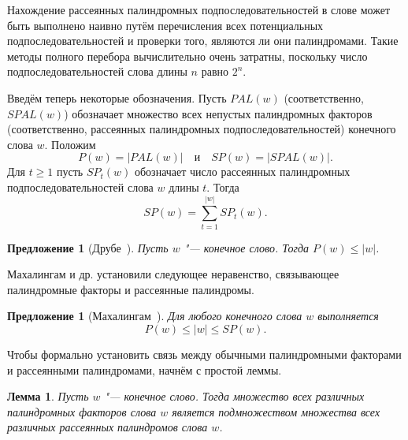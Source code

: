 \documentclass[a4paper,14pt]{extreport}
\theoremstyle{plain}
\newtheorem{lemma}{Лемма}[section]
\newtheorem{proposition}[theorem]{Предложение}
\theoremstyle{definition}
\theoremstyle{remark}
\begin{document}
Нахождение рассеянных палиндромных подпоследовательностей в слове может быть выполнено наивно путём перечисления всех потенциальных подпоследовательностей и проверки того, являются ли они палиндромами. Такие методы полного перебора вычислительно очень затратны, поскольку число подпоследовательностей слова длины $n$ равно $2^n$.

Введём теперь некоторые обозначения. Пусть $PAL(w)$ (соответственно, $SPAL(w)$) обозначает множество всех непустых палиндромных факторов (соответственно, рассеянных палиндромных подпоследовательностей) конечного слова $w$. Положим
\begin{equation}
	P(w) = |PAL(w)| \quad \text{и} \quad SP(w) = |SPAL(w)|.
\end{equation}
Для $t \geq 1$ пусть $SP_t(w)$ обозначает число рассеянных палиндромных подпоследовательностей слова $w$ длины $t$. Тогда
\begin{equation}
	SP(w) = \sum_{t=1}^{|w|} SP_t(w).
\end{equation}

\begin{proposition}[Друбе~\cite{Droubay}]\label{pro.5.3}
	Пусть $w$ "--- конечное слово. Тогда $P(w) \leq |w|$.
\end{proposition}

Махалингам и др. установили следующее неравенство, связывающее палиндромные факторы и рассеянные палиндромы.

\begin{proposition}[Махалингам~\cite{Mahalingam}]
	Для любого конечного слова $w$ выполняется
	\begin{equation}
		P(w) \leq |w| \leq SP(w).
	\end{equation}
\end{proposition}

Чтобы формально установить связь между обычными палиндромными факторами и рассеянными палиндромами, начнём с простой леммы.

\begin{lemma}\label{lem:pal_subset_spal}
	Пусть $w$ "--- конечное слово. Тогда множество всех различных палиндромных факторов слова $w$ является подмножеством множества всех различных рассеянных палиндромов слова $w$.
\end{lemma}
\end{document}
